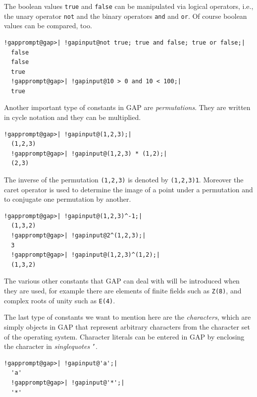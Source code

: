 \documentclass[a4paper,11pt]{report}
\begin{document}
{{ The boolean values \texttt{true} and \texttt{false} can be manipulated via logical operators, i.{\nobreakspace}e., the unary
operator \texttt{not} and the binary operators \texttt{and} and \texttt{or}. Of course boolean values can be compared, too. 

 
\begin{Verbatim}[commandchars=!@|,fontsize=\small,frame=single,label=Example]
  !gapprompt@gap>| !gapinput@not true; true and false; true or false;|
  false
  false
  true
  !gapprompt@gap>| !gapinput@10 > 0 and 10 < 100;|
  true
\end{Verbatim}
 

 Another important type of constants in \textsf{GAP} are \emph{permutations}. They are written in cycle notation and they can be multiplied. 

 
\begin{Verbatim}[commandchars=!@|,fontsize=\small,frame=single,label=Example]
  !gapprompt@gap>| !gapinput@(1,2,3);|
  (1,2,3)
  !gapprompt@gap>| !gapinput@(1,2,3) * (1,2);|
  (2,3)
\end{Verbatim}
 

 The inverse of the permutation \texttt{(1,2,3)} is denoted by \texttt{(1,2,3)\texttt{}\texttt{}1}. Moreover the caret operator \texttt{\texttt{}} is used to determine the image of a point under a permutation and to conjugate
one permutation by another. 

 
\begin{Verbatim}[commandchars=!@|,fontsize=\small,frame=single,label=Example]
  !gapprompt@gap>| !gapinput@(1,2,3)^-1;|
  (1,3,2)
  !gapprompt@gap>| !gapinput@2^(1,2,3);|
  3
  !gapprompt@gap>| !gapinput@(1,2,3)^(1,2);|
  (1,3,2)
\end{Verbatim}
 

 The various other constants that \textsf{GAP} can deal with will be introduced when they are used, for example there are
elements of finite fields such as \texttt{Z(8)}, and complex roots of unity such as \texttt{E(4)}. 

 The last type of constants we want to mention here are the \emph{characters}, which are simply objects in \textsf{GAP} that represent arbitrary characters from the character set of the operating
system. Character literals can be entered in \textsf{GAP} by enclosing the character in \emph{singlequotes} \texttt{'}. 

 
\begin{Verbatim}[commandchars=!@|,fontsize=\small,frame=single,label=Example]
  !gapprompt@gap>| !gapinput@'a';|
  'a'
  !gapprompt@gap>| !gapinput@'*';|
  '*'
\end{Verbatim}
 

}}
\end{document}
